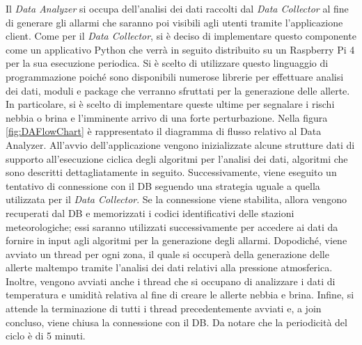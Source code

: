 Il \textit{Data Analyzer} si occupa dell'analisi dei dati raccolti dal \textit{Data Collector} al fine di generare gli allarmi che saranno poi visibili agli utenti tramite l'applicazione client. Come per il \textit{Data Collector}, si è deciso di implementare questo componente come un applicativo Python che verrà in seguito distribuito su un Raspberry Pi 4 per la sua esecuzione periodica. Si è scelto di utilizzare questo linguaggio di programmazione poiché sono disponibili numerose librerie per effettuare analisi dei dati, moduli e package che verranno sfruttati per la generazione delle allerte. In particolare, si è scelto di implementare queste ultime per segnalare i rischi nebbia o brina e l'imminente arrivo di una forte perturbazione. Nella figura \ref{fig:DAFlowChart} è rappresentato il diagramma di flusso relativo al Data Analyzer. All'avvio dell'applicazione vengono inizializzate alcune strutture dati di supporto all'esecuzione ciclica degli algoritmi per l'analisi dei dati, algoritmi che sono descritti dettagliatamente in seguito. Successivamente, viene eseguito un tentativo di connessione con il DB seguendo una strategia uguale a quella utilizzata per il \textit{Data Collector}. Se la connessione viene stabilita, allora vengono recuperati dal DB e memorizzati i codici identificativi delle stazioni meteorologiche; essi saranno utilizzati successivamente per accedere ai dati da fornire in input agli algoritmi per la generazione degli allarmi. Dopodiché, viene avviato un thread per ogni zona, il quale si occuperà della generazione delle allerte maltempo tramite l'analisi dei dati relativi alla pressione atmosferica. Inoltre, vengono avviati anche i thread che si occupano di analizzare i dati di temperatura e umidità relativa al fine di creare le allerte nebbia e brina. Infine, si attende la terminazione di tutti i thread precedentemente avviati e, a join concluso, viene chiusa la connessione con il DB. Da notare che la periodicità del ciclo è di 5 minuti.

